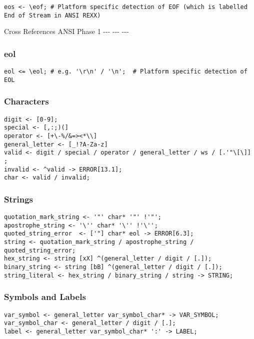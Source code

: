 \begin{verbatim}
eos <- \eof; # Platform specific detection of EOF (which is labelled End of Stream in ANSI REXX)
\end{verbatim}

\textbar{} Cross References \textbar{} {ANSI} \textbar{} {Phase 1} \textbar{}
\textbar{} -{}-{}- \textbar{} -{}-{}- \textbar{} -{}-{}- \textbar{}

\subsubsection{eol}

\begin{verbatim}
eol <= \eol; # e.g. '\r\n' / '\n';  # Platform specific detection of EOL
\end{verbatim}

\subsubsection{Characters}

\begin{verbatim}
digit <- [0-9];
special <- [,:;)(]
operator <- [+\-%/&=><*\\]
general_letter <- [_!?A-Za-z]
valid <- digit / special / operator / general_letter / ws / [.'"\[\]] ;
invalid <- ^valid -> ERROR[13.1];
char <- valid / invalid;
\end{verbatim}

\subsubsection{Strings}

\begin{verbatim}
quotation_mark_string <- '"' char* '"' !'"'; 
apostrophe_string <- '\'' char* '\'' !'\'';
quoted_string_error  <- ['"] char* eol -> ERROR[6.3]; 
string <- quotation_mark_string / apostrophe_string / quoted_string_error;
hex_string <- string [xX] ^(general_letter / digit / [.]);
binary_string <- string [bB] ^(general_letter / digit / [.]);
string_literal <- hex_string / binary_string / string -> STRING;
\end{verbatim}

\subsubsection{Symbols and Labels}

\begin{verbatim}
var_symbol <- general_letter var_symbol_char* -> VAR_SYMBOL;
var_symbol_char <- general_letter / digit / [.];
label <- general_letter var_symbol_char* ':' -> LABEL;
\end{verbatim}

